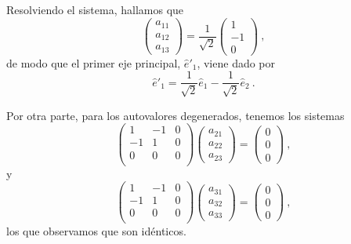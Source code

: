\begin{ejemplo}
    Resolviendo el sistema, hallamos que 
    \begin{equation*}
        \begin{pmatrix}
            a_{11} \\ a_{12} \\ a_{13}
        \end{pmatrix}
        = \frac{1}{\sqrt{2}} \begin{pmatrix}
            1 \\ -1 \\ 0
        \end{pmatrix} \ ,
    \end{equation*}
    de modo que el primer eje principal, $\hat{e}'_1$, viene dado por
    \begin{equation*}
        \hat{e}'_1 = \frac{1}{\sqrt{2}}\hat{e}_1 - \frac{1}{\sqrt{2}}\hat{e}_2 \ .
    \end{equation*}

    Por otra parte, para los autovalores degenerados, tenemos los sistemas 
    \begin{equation*}
        \begin{pmatrix}
            1 & -1 & 0 \\
            -1 & 1 & 0 \\
            0 & 0 & 0 \\
        \end{pmatrix}
        \begin{pmatrix}
            a_{21} \\ a_{22} \\ a_{23}
        \end{pmatrix}
        = \begin{pmatrix}
            0 \\ 0 \\ 0
        \end{pmatrix} \ ,
    \end{equation*}
    y
    \begin{equation*}
        \begin{pmatrix}
            1 & -1 & 0 \\
            -1 & 1 & 0 \\
            0 & 0 & 0 \\
        \end{pmatrix}
        \begin{pmatrix}
            a_{31} \\ a_{32} \\ a_{33}
        \end{pmatrix}
        = \begin{pmatrix}
            0 \\ 0 \\ 0
        \end{pmatrix} \ ,
    \end{equation*}
    los que observamos que son idénticos.


\end{ejemplo}
